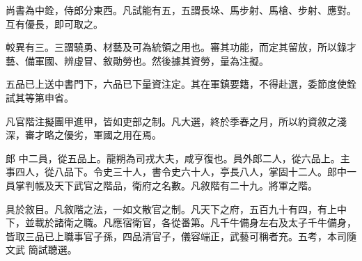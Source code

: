 \begin{pinyinscope}
 尚書為中銓，侍郎分東西。凡試能有五，五謂長垛、馬步射、馬槍、步射、應對。互有優長，即可取之。



 較異有三。三謂驍勇、材藝及可為統領之用也。審其功能，而定其留放，所以錄才藝、備軍國、辨虛冒、敘勛勞也。然後據其資勞，量為注擬。



 五品已上送中書門下，六品已下量資注定。其在軍鎮要籍，不得赴選，委節度使銓試其等第申省。



 凡官階注擬團甲進甲，皆如吏部之制。凡大選，終於季春之月，所以約資敘之淺深，審才略之優劣，軍國之用在焉。



 郎
 中二員，從五品上。龍朔為司戎大夫，咸亨復也。員外郎二人，從六品上。主事四人，從八品下。令史三十人，書令史六十人，亭長八人，掌固十二人。郎中一員掌判帳及天下武官之階品，衛府之名數。凡敘階有二十九。將軍之階。



 具於敘目。凡敘階之法，一如文散官之制。凡天下之府，五百九十有四，有上中下，並載於諸衛之職。凡應宿衛官，各從番第。凡千牛備身左右及太子千牛備身，皆取三品已上職事官子孫，四品清官子，儀容端正，武藝可稱者充。五考，本司隨文武
 簡試聽選。




\end{pinyinscope}
